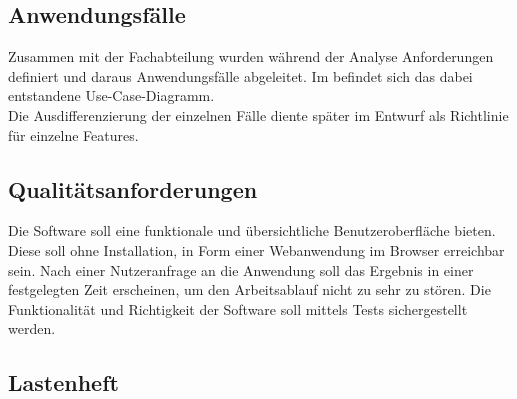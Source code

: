 \subsection{Anwendungsfälle}
\label{sec:Anwendungsfaelle}
Zusammen mit der Fachabteilung wurden während der Analyse Anforderungen definiert und daraus Anwendungsfälle
abgeleitet. Im  befindet sich das dabei entstandene Use-Case-Diagramm.\\
Die Ausdifferenzierung der einzelnen Fälle diente später im Entwurf als Richtlinie für einzelne Features.

\subsection{Qualitätsanforderungen}
\label{sec:Qualitaetsanforderungen}
Die Software soll eine funktionale und übersichtliche Benutzeroberfläche bieten.
Diese soll ohne Installation, in Form einer Webanwendung im Browser erreichbar sein.
Nach einer Nutzeranfrage an die Anwendung soll das Ergebnis in einer festgelegten Zeit erscheinen,
um den Arbeitsablauf nicht zu sehr zu stören.
Die Funktionalität und Richtigkeit der Software soll mittels Tests sichergestellt werden.


\subsection{Lastenheft}
\label{sec:Lastenheft}

